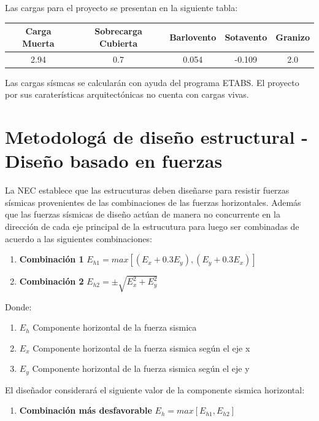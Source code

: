 \documentclass{report}
\begin{document}
Las cargas para el proyecto se presentan en la siguiente tabla:

\begin{table}[h]
    \centering
    \begin{tabular}{|c|c|c|c|c|}
        \hline
        \textbf{Carga Muerta} & \textbf{Sobrecarga Cubierta} & \textbf{Barlovento} & \textbf{Sotavento} & \textbf{Granizo} \\
        \hline
        2.94 & 0.7 & 0.054 & -0.109 & 2.0\\
        \hline
    \end{tabular}
\end{table}

Las cargas s\'ismcas se calcular\'an con ayuda del programa ETABS.
El proyecto por sus carater\'isticas arquitect\'onicas no cuenta con cargas vivas.


\chapter{Metodolog\'a de dise\~{n}o estructural - Dise\~{n}o basado en fuerzas}
La NEC establece que las estrucuturas deben dise\~{n}arse para resistir fuerzas s\'ismicas provenientes de las 
combinaciones de las fuerzas horizontales. Adem\'as que las fuerzas s\'ismicas de dise\~{n}o act\'uan de manera
no concurrente en la direcci\'on de cada eje principal de la estrucutura para luego ser combinadas de acuerdo a 
las siguientes combinaciones:
\begin{enumerate}
    \item \textbf{Combinaci\'on 1} $E_{h1} = max[(E_x + 0.3E_y), (E_y + 0.3E_x)]$
    \item \textbf{Combinaci\'on 2} $E_{h2} =\pm \sqrt{E_x^2 + E_y^2}$
\end{enumerate}

Donde:

\begin{enumerate}
    \item[\textbullet] $E_{h}$ Componente horizontal de la fuerza s\-ismica
    \item[\textbullet] $E_x$ Componente horizontal de la fuerza s\-ismica seg\'un el eje x
    \item[\textbullet] $E_y$ Componente horizontal de la fuerza s\-ismica seg\'un el eje y
\end{enumerate}

El dise\~{n}ador considerar\'a el siguiente valor de la componente s\-ismica horizontal: 
\begin{enumerate}
    \item \textbf{Combinaci\'on m\'as desfavorable} $E_h = max[E_{h1}, E_{h2}]$
\end{enumerate}
\end{document}
